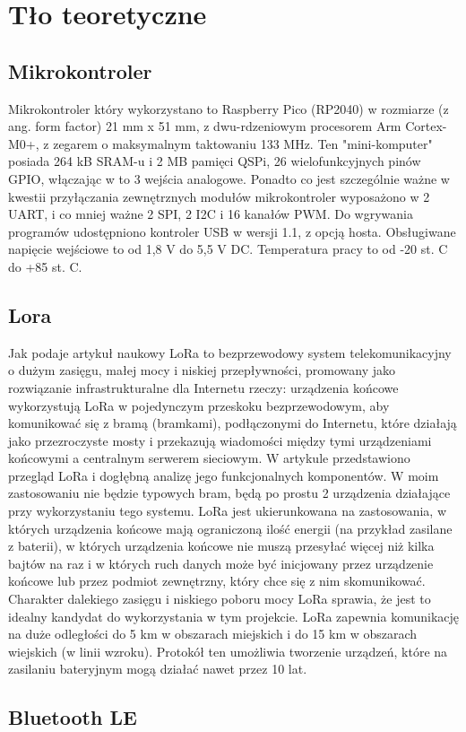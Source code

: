\chapter{Tło teoretyczne}

\section{Mikrokontroler}
Mikrokontroler który wykorzystano to Raspberry Pico (RP2040)\cite{pico2024} w rozmiarze (z ang. form factor) 21 mm x 51 mm, z dwu-rdzeniowym procesorem Arm Cortex-M0+, z zegarem o maksymalnym taktowaniu 133 MHz. Ten "mini-komputer" posiada 264 kB SRAM-u i 2 MB pamięci QSPi, 26 wielofunkcyjnych pinów GPIO, włączając w to 3 wejścia analogowe.
Ponadto co jest szczególnie ważne w kwestii przyłączania zewnętrznych modułów mikrokontroler wyposażono w 2 UART, i co mniej ważne 2 SPI, 2 I2C i 16 kanałów PWM.
Do wgrywania programów udostępniono kontroler USB w wersji 1.1, z opcją hosta.
Obsługiwane napięcie wejściowe to od 1,8 V do 5,5 V DC.
Temperatura pracy to od -20 st. C do +85 st. C.
\section{Lora}
Jak podaje artykuł naukowy\cite{Augustin2016} LoRa to bezprzewodowy system telekomunikacyjny o dużym zasięgu, małej mocy i niskiej przepływności, promowany jako rozwiązanie infrastrukturalne dla Internetu rzeczy: urządzenia końcowe wykorzystują LoRa w pojedynczym przeskoku bezprzewodowym, aby komunikować się z bramą (bramkami), podłączonymi do Internetu, które działają jako przezroczyste mosty i przekazują wiadomości między tymi urządzeniami końcowymi a centralnym serwerem sieciowym. W artykule przedstawiono przegląd LoRa i dogłębną analizę jego funkcjonalnych komponentów.
W moim zastosowaniu nie będzie typowych bram, będą po prostu 2 urządzenia działające przy wykorzystaniu tego systemu.
LoRa jest ukierunkowana na zastosowania, w których urządzenia końcowe mają ograniczoną ilość energii (na przykład zasilane z baterii), w których urządzenia końcowe nie muszą przesyłać więcej niż kilka bajtów na raz i w których ruch danych może być inicjowany przez urządzenie końcowe lub przez podmiot zewnętrzny, który chce się z nim skomunikować. Charakter dalekiego zasięgu i niskiego poboru mocy LoRa sprawia, że jest to idealny kandydat do wykorzystania w tym projekcie.
LoRa zapewnia komunikację na duże odległości do 5 km w obszarach miejskich i do 15 km w obszarach wiejskich (w linii wzroku).
Protokół ten umożliwia tworzenie urządzeń, które na zasilaniu bateryjnym mogą działać nawet przez 10 lat.
\section{Bluetooth LE}
